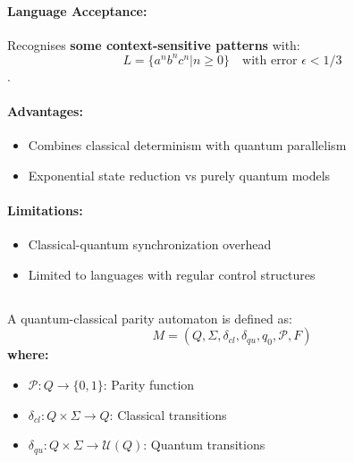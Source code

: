 \paragraph{Language Acceptance:}
Recognises \textbf{some context-sensitive patterns} with:
\[ L = \{a^nb^nc^n | n \geq 0\} \quad \text{with error } \epsilon < 1/3 \]\cite{zheng2012two, gruska2005}.

\paragraph{Advantages:}
\begin{itemize}
    \item Combines classical determinism with quantum parallelism
    \item Exponential state reduction vs purely quantum models
\end{itemize}

\paragraph{Limitations:}
\begin{itemize}
    \item Classical-quantum synchronization overhead
    \item Limited to languages with regular control structures
\end{itemize}

\subsection{}
\label{subsec:qcpa}

\begin{definition}
A quantum-classical parity automaton is defined as:
\[
M = (Q, \Sigma, \delta_{cl}, \delta_{qu}, q_0, \mathcal{P}, F)
\]
\textbf{where:}
\begin{itemize}
    \item $\mathcal{P}: Q \rightarrow \{0,1\}$: Parity function
    \item $\delta_{cl}: Q \times \Sigma \rightarrow Q$: Classical transitions
    \item $\delta_{qu}: Q \times \Sigma \rightarrow \mathcal{U}(Q)$: Quantum transitions
\end{itemize}
\end{definition}

